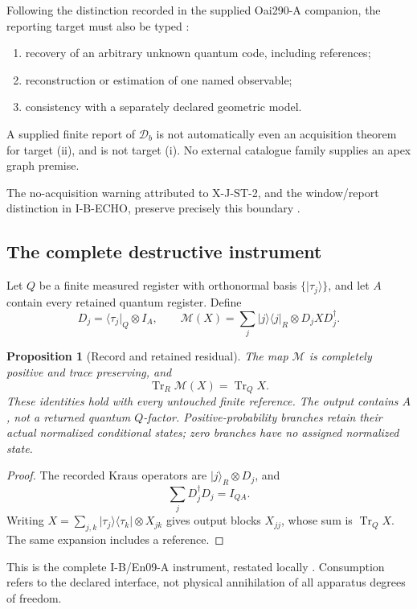 \documentclass[11pt,a4paper]{article}
\newcommand{\Tr}{\operatorname{Tr}}
\newcommand{\ket}[1]{\lvert#1\rangle}
\newcommand{\bra}[1]{\langle#1\rvert}
\newcommand{\proj}[1]{\lvert#1\rangle\langle#1\rvert}
\newcommand{\Dcal}{\mathcal D}
\theoremstyle{plain}
\newtheorem{proposition}[theorem]{Proposition}
\theoremstyle{definition}
\theoremstyle{remark}
\numberwithin{equation}{section}
\begin{document}
Following the distinction recorded in the supplied Oai290-A
companion, the reporting target must also be typed
\cite{CheungOai290}:
\begin{enumerate}[label=\textup{(\roman*)}]
\item recovery of an arbitrary unknown quantum code, including
references;
\item reconstruction or estimation of one named observable;
\item consistency with a separately declared geometric model.
\end{enumerate}
A supplied finite report of \(\Dcal_b\) is not automatically even
an acquisition theorem for target (ii), and is not target (i).
No external catalogue family supplies an apex graph premise.

The no-acquisition warning attributed to X-J-ST-2, and the
window/report distinction in I-B-ECHO, preserve precisely this
boundary \cite{CheungXJ2,CheungEcho}.

\subsection{The complete destructive instrument}

Let \(Q\) be a finite measured register with orthonormal basis
\(\{\ket{\tau_j}\}\), and let \(A\) contain every retained quantum
register. Define
\[
 D_j=\bra{\tau_j}_Q\otimes I_A,\qquad
 \mathcal M(X)=\sum_j\proj j_R\otimes D_jXD_j^\dagger.
\]

\begin{proposition}[Record and retained residual]
\label{prop:instrument}
The map \(\mathcal M\) is completely positive and trace preserving,
and
\[
 \Tr_R\mathcal M(X)=\Tr_QX.
\]
These identities hold with every untouched finite reference.
The output contains \(A\), not a returned quantum \(Q\)-factor.
Positive-probability branches retain their actual normalized
conditional states; zero branches have no assigned normalized
state.
\end{proposition}

\begin{proof}
The recorded Kraus operators are \(\ket j_R\otimes D_j\), and
\[
 \sum_jD_j^\dagger D_j=I_{QA}.
\]
Writing
\(X=\sum_{j,k}\ket{\tau_j}\bra{\tau_k}\otimes X_{jk}\)
gives output blocks \(X_{jj}\), whose sum is \(\Tr_QX\).
The same expansion includes a reference.
\end{proof}

This is the complete I-B/En09-A instrument, restated locally
\cite{CheungIB,CheungEn09}. Consumption refers to the declared
interface, not physical annihilation of all apparatus degrees
of freedom.
\end{document}
